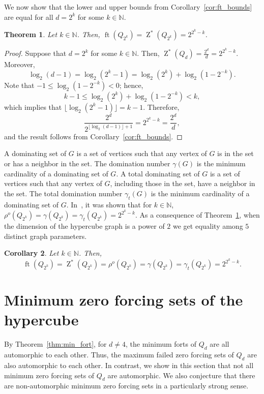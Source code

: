 \documentclass[twoside, 12pt]{article}
\newtheorem{theorem}{Theorem}[section]
\newtheorem{corollary}[theorem]{Corollary}
\theoremstyle{definition}
\newcommand\floor[1]{\lfloor#1\rfloor}
\DeclareMathOperator{\Z}{Z}
\DeclareMathOperator{\ft}{ft}
\begin{document}
We now show that the lower and upper bounds from Corollary~\ref{cor:ft_bounds} are equal for all $d=2^{k}$ for some $k\in\mathbb{N}$.
\begin{theorem}\label{thm:ft_sharp_bound}
Let $k\in\mathbb{N}$.
Then, $\ft(Q_{2^{k}}) = \Z^{*}(Q_{2^{k}}) = 2^{2^{k}-k}$.
\end{theorem}
\begin{proof}
Suppose that $d=2^{k}$ for some $k\in\mathbb{N}$. 
Then, $\Z^{*}(Q_{d}) = \frac{2^{d}}{d}=2^{2^{k}-k}$. 
Moreover, 
\[
\log_{2}(d-1) = \log_{2}(2^{k}-1) = \log_{2}(2^{k}) + \log_{2}(1-2^{-k}).
\]
Note that $-1 \leq \log_{2}(1-2^{-k}) < 0$; hence,
\[
k-1 \leq \log_{2}(2^{k}) + \log_{2}(1-2^{-k}) < k,
\]
which implies that $\floor{\log_{2}(2^{k}-1)} = k-1$.
Therefore, 
\[
\frac{2^{d}}{2^{\floor{\log_{2}(d-1)}+1}} = 2^{2^{k}-k} = \frac{2^{d}}{d},
\]
and the result follows from Corollary~\ref{cor:ft_bounds}.
\end{proof}

 A dominating set of $G$ is a set of vertices such that any vertex of $G$ is in the set or has a neighbor in the set.
The domination number $\gamma(G)$ is the minimum cardinality of a dominating set of $G$. 
A total dominating set of $G$ is a set of vertices such that any vertex of $G$, including those in the set, have a neighbor in the set.
The total domination number $\gamma_{t}(G)$ is the minimum cardinality of a dominating set of $G$. In~\cite{Bresar2024}, it was shown that for $k\in\mathbb{N}$,
$\rho^{o}(Q_{2^{k}}) = \gamma(Q_{2^{k}}) = \gamma_{t}(Q_{2^{k}}) = 2^{2^{k}-k}$.
As a consequence of Theorem~\ref{thm:ft_sharp_bound}, when the dimension of the hypercube graph is a power of $2$ we get equality among $5$ distinct graph parameters.
\begin{corollary}\label{cor:sharp_bounds}
Let $k\in\mathbb{N}$.
Then,
\[
\ft(Q_{2^{k}}) = \Z^{*}(Q_{2^{k}}) = \rho^{o}(Q_{2^{k}}) = \gamma(Q_{2^{k}}) = \gamma_{t}(Q_{2^{k}}) = 2^{2^{k}-k}. 
\]
\end{corollary}
\section{Minimum zero forcing sets of the hypercube}\label{sec:minimum_zf_sets}
By Theorem~\ref{thm:min_fort}, for $d\neq 4$, the minimum forts of $Q_{d}$ are all automorphic to each other. Thus, the maximum failed zero forcing sets of $Q_{d}$ are also automorphic to each other. 
In contrast, we show in this  section that not all minimum zero forcing sets of $Q_d$ are automorphic. We also conjecture that there are non-automorphic minimum zero forcing sets in a particularly strong sense.
\end{document}
